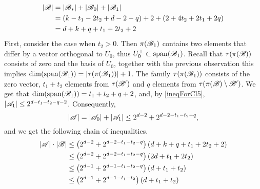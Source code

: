 \begin{enumerate}
\begin{enumerate}
\begin{enumerate}
                \begin{equation*}
                    \begin{split}
                        \left|{\mathscr{B}}\right|
                        & = \left|{\mathscr{B}}_*\right|+\left|{\mathscr{B}}_0\right|+\left|{\mathscr{B}}_1\right| \\
                        & = (k-t_1-2t_2+d-2-q)+2+(2+4t_2+2t_1+2q) \\ 
                        & = d + k + q + t_1 + 2t_2 + 2
                    \end{split}
                \end{equation*}
                First, consider the case when $t_2 > 0$. Then $\pi({\mathscr{B}}_1)$ contains two elements that differ by a vector orthogonal to $U_0$, thus $U_0^\bot\subset\operatorname{span}({\mathscr{B}}_1)$. Recall that $\tau(\pi({\mathscr{B}}))$ consists of zero and the basis of $U_0$, together with the previous observation this implies $\operatorname{dim}(\operatorname{span}({\mathscr{B}}_1)) = |\tau(\pi({\mathscr{B}}_1))|+1$. The family $\tau(\pi({\mathscr{B}}_1))$ consists of the zero vector,  $t_1 + t_2$ elements from $\tau({\mathscr{B}}')$ and $q$ elements from $\tau(\pi({\mathscr{B}}) \setminus {\mathscr{B}}')$. We get that $\operatorname{dim}(\operatorname{span}({\mathscr{B}}_1)) = t_1+t_2+q+2$, and, by \eqref{ineqForCl5}, $|{\mathscr{A}}_1|\leq2^{d-t_1-t_2-q-2}$. Consequently,  $$|{\mathscr{A}}|= |{\mathscr{A}}_0| + |{\mathscr{A}}_1| \leq 2^{d-2} + 2^{d-2-t_1-t_2-q},$$ and we get the following chain of inequalities.
                \begin{align}
                    \left|\aaa\right|\cdot\left|\bb\right| 
                    & \leq \left(2^{d-2} + 2^{d-2-t_1-t_2-q}\right)\left(d+k+q+t_1+2t_2+2\right) \nonumber \\ 
                    & \leq \left(2^{d-2} + 2^{d-2-t_1-t_2-q}\right)\left(2d+t_1+2t_2\right) \label{mid1} \\
                    & \leq \left(2^{d-1} + 2^{d-1-t_1-t_2-q}\right)\left(d+t_1+t_2\right) \nonumber \\
                    & \leq \left(2^{d-1} + 2^{d-1-t_1-t_2}\right)\left(d+t_1+t_2\right) \label{mid2} \\

\end{align}
\end{enumerate}
\end{enumerate}
\end{enumerate}
